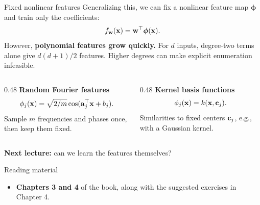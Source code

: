 \begin{frame}{Fixed nonlinear features}
	\setlength{\abovedisplayskip}{5pt}\setlength{\belowdisplayskip}{5pt}
	Generalizing this, we can fix a nonlinear feature map $\boldsymbol{\phi}$ and train only the coefficients:
	\[
		f_{\boldsymbol{\mathbf{w}}}(\boldsymbol{\mathbf{x}})=\boldsymbol{\mathbf{w}}^{\top}\boldsymbol{\phi}(\boldsymbol{\mathbf{x}}).
	\]
	\medskip
	However, \textbf{polynomial features grow quickly.} For $d$ inputs, degree-two terms alone
	give $d(d+1)/2$ features. Higher degrees can make explicit enumeration infeasible.

	\medskip
	\begin{columns}[T,onlytextwidth]
		\begin{column}{0.48\textwidth}
			\textbf{\color{darkcerulean}Random Fourier features}
			\[
				\phi_j(\boldsymbol{\mathbf{x}})=\sqrt{2/m}\cos(\boldsymbol{\mathbf{a}}_j^{\top}\boldsymbol{\mathbf{x}}+b_j).
			\]
			Sample $m$ frequencies and phases once, then keep them fixed.
		\end{column}
		\begin{column}{0.48\textwidth}
			\textbf{\color{darkcerulean}Kernel basis functions}
			\[
				\phi_j(\boldsymbol{\mathbf{x}})=k(\boldsymbol{\mathbf{x}},\boldsymbol{\mathbf{c}}_j).
			\]
			Similarities to fixed centers $\boldsymbol{\mathbf{c}}_j$, e.g., with a Gaussian kernel.
		\end{column}
	\end{columns}

	\medskip
	\begin{tcolorbox}[nndsgreen,boxsep=1mm,top=1mm,bottom=1mm]
		\textbf{Next lecture:} can we learn the features themselves?
	\end{tcolorbox}
\end{frame}

\begin{frame}{Reading material}

	\begin{itemize}
		\item \textbf{Chapters 3 and 4} of the book, along with the suggested exercises in Chapter 4.
	\end{itemize}

\end{frame}

